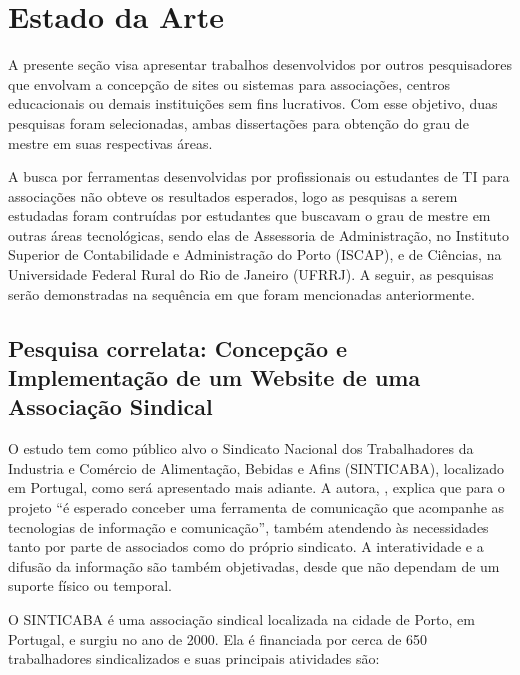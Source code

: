 \hspace{2.5cm}

\hspace{2.5cm}
\section{Estado da Arte}
\label{sec:trabalhoscorrelatos}
\hspace{2.5cm}

A presente seção visa apresentar trabalhos desenvolvidos por outros pesquisadores que envolvam a concepção de sites ou sistemas para associações, centros educacionais ou demais instituições sem fins lucrativos. Com esse objetivo, duas pesquisas foram selecionadas, ambas dissertações para obtenção do grau de mestre em suas respectivas áreas. 

A busca por ferramentas desenvolvidas por profissionais ou estudantes de TI para associações não obteve os resultados esperados, logo as pesquisas a serem estudadas foram contruídas por estudantes que buscavam o grau de mestre em outras áreas tecnológicas, sendo elas de Assessoria de Administração, no Instituto Superior de Contabilidade e Administração do Porto (ISCAP), e de Ciências, na Universidade Federal Rural do Rio de Janeiro (UFRRJ). A seguir, as pesquisas serão demonstradas na sequência em que foram mencionadas anteriormente. 

\hspace{2.5cm}
\subsection{Pesquisa correlata: Concepção e Implementação de um Website de uma Associação Sindical}
\hspace{2.5cm}

O estudo tem como público alvo o Sindicato Nacional dos Trabalhadores da Industria e Comércio de Alimentação, Bebidas e Afins (SINTICABA), localizado em Portugal, como será apresentado mais adiante. A autora, , explica que para o projeto ``é esperado conceber uma ferramenta de comunicação que acompanhe as tecnologias de informação e comunicação'', também atendendo às necessidades tanto por parte de associados como do próprio sindicato. A interatividade e a difusão da informação são também objetivadas, desde que não dependam de um suporte físico ou temporal.

O SINTICABA é uma associação sindical localizada na cidade de Porto, em Portugal, e surgiu no ano de 2000. Ela é financiada por cerca de 650 trabalhadores sindicalizados e suas principais atividades são: 

